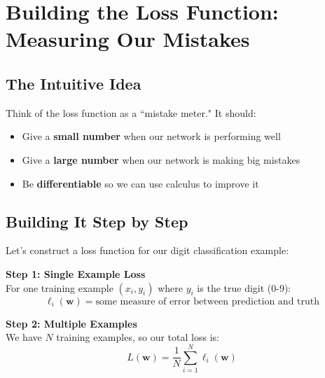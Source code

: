 \documentclass[11pt]{article}
\newcommand{\w}{\mathbf{w}}
\begin{document}
\section{Building the Loss Function: Measuring Our Mistakes}

\subsection{The Intuitive Idea}
Think of the loss function as a ``mistake meter." It should:
\begin{itemize}
\item Give a \textbf{small number} when our network is performing well
\item Give a \textbf{large number} when our network is making big mistakes
\item Be \textbf{differentiable} so we can use calculus to improve it
\end{itemize}

\subsection{Building It Step by Step}

Let's construct a loss function for our digit classification example:

\textbf{Step 1: Single Example Loss}\\
For one training example $(x_i, y_i)$ where $y_i$ is the true digit (0-9):
\begin{equation}
\ell_i(\w) = \text{some measure of error between prediction and truth}
\end{equation}

\textbf{Step 2: Multiple Examples}\\
We have $N$ training examples, so our total loss is:
\begin{equation}
\boxed{L(\w) = \frac{1}{N} \sum_{i=1}^{N} \ell_i(\w)}
\end{equation}
\end{document}
